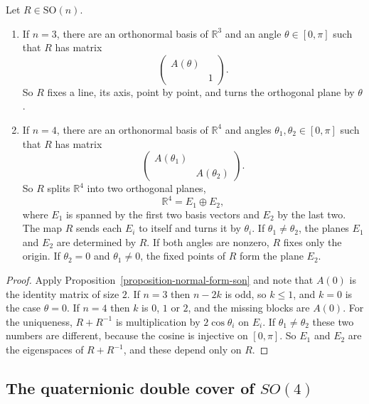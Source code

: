 \begin{corollary}
\label{corollary-normal-form-so3-so4}
Let $R \in \text{SO}(n)$.
\begin{enumerate}
\item If $n=3$, there are an orthonormal
basis of $\mathbb{R}^3$ and an angle
$\theta \in [0,\pi]$ such that $R$ has
matrix
$$
\begin{pmatrix}
A(\theta) & \\
& 1
\end{pmatrix}.
$$
So $R$ fixes a line, its axis, point by
point, and turns the orthogonal plane by
$\theta$.
\item If $n=4$, there are an orthonormal
basis of $\mathbb{R}^4$ and angles
$\theta_1,\theta_2 \in [0,\pi]$ such that
$R$ has matrix
$$
\begin{pmatrix}
A(\theta_1) & \\
& A(\theta_2)
\end{pmatrix}.
$$
So $R$ splits $\mathbb{R}^4$ into two
orthogonal planes,
$$
\mathbb{R}^4=E_1\oplus E_2,
$$
where $E_1$ is spanned by the first two
basis vectors and $E_2$ by the last two.
The map $R$ sends each $E_i$ to itself and
turns it by $\theta_i$. If
$\theta_1 \neq \theta_2$, the planes $E_1$
and $E_2$ are determined by $R$. If both
angles are nonzero, $R$ fixes only the
origin. If $\theta_2=0$ and
$\theta_1 \neq 0$, the fixed points of $R$
form the plane $E_2$.
\end{enumerate}
\end{corollary}

\begin{proof}
Apply
Proposition~\ref{proposition-normal-form-son}
and note that $A(0)$ is the identity
matrix of size $2$. If $n=3$ then $n-2k$
is odd, so $k \leq 1$, and $k=0$ is the
case $\theta=0$. If $n=4$ then $k$ is $0$,
$1$ or $2$, and the missing blocks are
$A(0)$. For the uniqueness, $R+R^{-1}$ is
multiplication by $2\cos\theta_i$ on $E_i$.
If $\theta_1 \neq \theta_2$ these two
numbers are different, because the cosine
is injective on $[0,\pi]$. So $E_1$ and
$E_2$ are the eigenspaces of $R+R^{-1}$,
and these depend only on $R$.
\end{proof}




\subsection{The quaternionic double cover of $SO(4)$}
\label{subsection-quaternionic-double-cover-so4}

